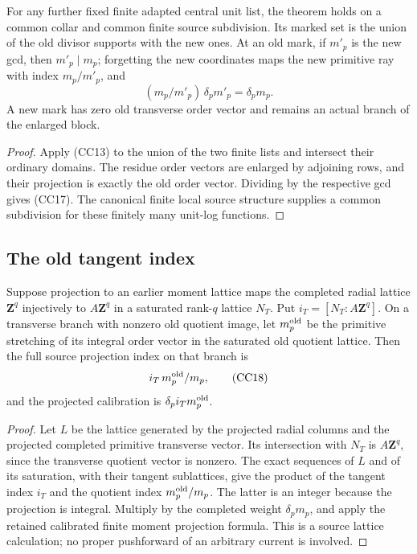 \begin{corollary}
\label{cor:r13-cc-adapted-enlargement}
For any further fixed finite adapted central unit list, the theorem
holds on a common collar and common finite source subdivision.
Its marked set is the union of the old divisor supports with the
new ones.  At an old mark, if \(m'_p\) is the new gcd, then
\(m'_p\mid m_p\); forgetting the new coordinates maps the new
primitive ray with index \(m_p/m'_p\), and
\[
              (m_p/m'_p)\,\delta_pm'_p=\delta_pm_p.
 \tag{CC17}
\]
A new mark has zero old transverse order vector and remains an
actual branch of the enlarged block.
\end{corollary}

\begin{proof}
Apply (CC13) to the union of the two finite lists and intersect
their ordinary domains.  The residue order vectors are enlarged
by adjoining rows, and their projection is exactly the old order
vector.  Dividing by the respective gcd gives (CC17).  The
canonical finite local source structure supplies a common
subdivision for these finitely many unit-log functions.
\end{proof}

\subsection{The old tangent index}

\begin{proposition}
\label{prop:r13-cc-tangent-index}
Suppose projection to an earlier moment lattice maps the completed
radial lattice \(\mathbf Z^q\) injectively to \(A\mathbf Z^q\)
in a saturated rank-\(q\) lattice \(N_T\).  Put
\(i_T=[N_T:A\mathbf Z^q]\).  On a transverse branch with nonzero
old quotient image, let \(m_p^{\rm old}\) be the primitive
stretching of its integral order vector in the saturated old
quotient lattice.  Then the full source projection index on that
branch is
\[
                       i_T\,m_p^{\rm old}/m_p,
 \tag{CC18}
\]
and the projected calibration is
\(\delta_p i_Tm_p^{\rm old}\).
\end{proposition}

\begin{proof}
Let \(L\) be the lattice generated by the projected radial
columns and the projected completed primitive transverse vector.
Its intersection with \(N_T\) is \(A\mathbf Z^q\), since the
transverse quotient vector is nonzero.  The exact sequences of
\(L\) and of its saturation, with their tangent sublattices,
give the product of the tangent index \(i_T\) and the quotient
index \(m_p^{\rm old}/m_p\).  The latter is an integer because
the projection is integral.  Multiply by the completed weight
\(\delta_pm_p\), and apply the retained calibrated finite moment
projection formula.  This is a source lattice calculation; no
proper pushforward of an arbitrary current is involved.
\end{proof}

